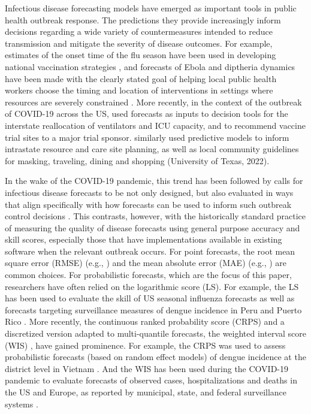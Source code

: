 \documentclass{article}\usepackage[]{graphicx}\usepackage[]{xcolor}
\begin{document}
Infectious disease forecasting models have emerged as important tools in public health outbreak response. The
predictions they provide increasingly inform decisions regarding a wide variety of countermeasures intended to reduce
transmission and mitigate the severity of disease outcomes. For example, estimates of the onset time of the flu season
have been used in developing national vaccination strategies \citep{igboh2023timing}, and forecasts of Ebola and
diptheria dynamics have been made with the clearly stated goal of helping local public health workers choose the timing
and location of interventions in settings where resources are severely constrained 
\citep{meltzer2014estimating, rainisch2015regional, camacho2015-ebola-bed,finger_real-time_2019}. More recently, in the
context of the outbreak of COVID-19 across the US, \cite{bertsimas2021predictionsCOVID} used forecasts as inputs to
decision tools for the interstate reallocation of ventilators and ICU capacity, and to recommend vaccine trial sites to
a major trial sponsor. \cite{fox_real-time_2022} similarly used predictive models to inform intrastate resource and
care site planning, as well as local community guidelines for masking, traveling, dining and shopping (University of
Texas, 2022)\nocite{utnews2022}.

In the wake of the COVID-19 pandemic, this trend has been followed by calls for infectious disease forecasts to be not
only designed, but also evaluated in ways that align specifically with how forecasts can be used to inform such outbreak
control decisions \citep{marshall2023predictions, bilinski_adaptive_2023}. This contrasts, however, with the
historically standard practice of measuring the quality of disease forecasts using general purpose accuracy and skill
scores, especially those that have implementations available in existing software when the relevant outbreak occurs. For
point forecasts, the root mean square error (RMSE) (e.g., \cite{papastefanopoulos2020covid}) and the mean absolute error
(MAE) (e.g., \cite{johansson2016evaluating}) are common choices. For probabilistic forecasts, which are the focus of
this paper, researchers have often relied on the logarithmic score (LS). For example, the LS has been used to evaluate
the skill of US seasonal influenza forecasts \citep{mcgowan_collaborative_2019,reich_collaborative_2019} as well as
forecasts targeting surveillance measures of dengue incidence in Peru and Puerto Rico \citep{johansson_open_2019}. More
recently, the continuous ranked probability score (CRPS) and a discretized version adapted to multi-quantile forecasts,
the weighted interval score (WIS) \citep{bracher2021evaluating}, have gained prominence. For example, the CRPS was used
to assess probabilistic forecasts (based on random effect models) of dengue incidence at the district level in Vietnam
\citep{colon-gonzalez_probabilistic_2021}. And the WIS has been used during the COVID-19 pandemic to evaluate forecasts
of observed cases, hospitalizations and deaths in the US and Europe, as reported by municipal, state, and federal
surveillance systems \citep{cramer_evaluation_2022,fox_real-time_2022,sherratt2023predictive}.
\end{document}
